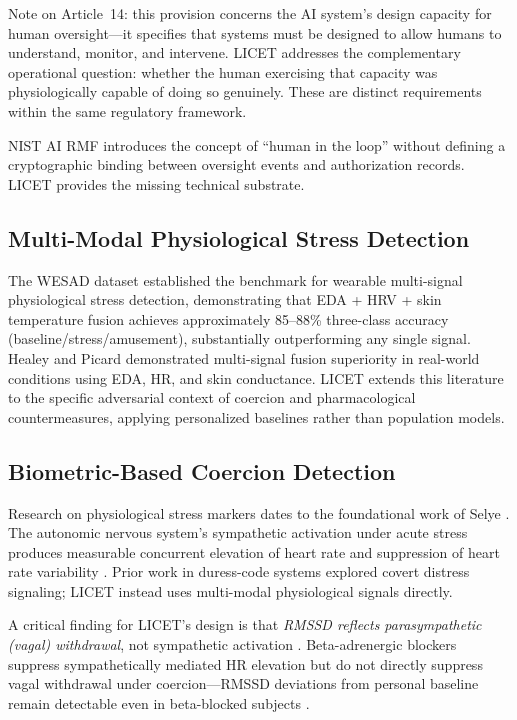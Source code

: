 \documentclass[12pt,a4paper]{article}
\begin{document}
Note on Article~14: this provision concerns the AI system's design capacity
for human oversight---it specifies that systems must be designed to allow
humans to understand, monitor, and intervene. LICET addresses the
complementary operational question: whether the human exercising that capacity
was physiologically capable of doing so genuinely. These are distinct
requirements within the same regulatory framework.

NIST AI RMF \cite{nistairimf2023} introduces the concept of ``human in the
loop'' without defining a cryptographic binding between oversight events and
authorization records. LICET provides the missing technical substrate.

\subsection{Multi-Modal Physiological Stress Detection}

The WESAD dataset \cite{schmidt2018wesad} established the benchmark for
wearable multi-signal physiological stress detection, demonstrating that
EDA + HRV + skin temperature fusion achieves approximately 85--88\% three-class
accuracy (baseline/stress/amusement), substantially outperforming any single
signal. Healey and Picard \cite{healey2005stress} demonstrated multi-signal
fusion superiority in real-world conditions using EDA, HR, and skin
conductance. LICET extends this literature to the specific adversarial context
of coercion and pharmacological countermeasures, applying personalized
baselines rather than population models.

\subsection{Biometric-Based Coercion Detection}

Research on physiological stress markers dates to the foundational work of
Selye \cite{selye1956stress}. The autonomic nervous system's sympathetic
activation under acute stress produces measurable concurrent elevation of heart
rate and suppression of heart rate variability \cite{thayer2012hrv,
kim2018stress}. Prior work in duress-code systems \cite{Capkun2006} explored
covert distress signaling; LICET instead uses multi-modal physiological
signals directly.

A critical finding for LICET's design is that \emph{RMSSD reflects
parasympathetic (vagal) withdrawal}, not sympathetic activation
\cite{fowles1986eda}. Beta-adrenergic blockers suppress sympathetically
mediated HR elevation but do not directly suppress vagal withdrawal under
coercion---RMSSD deviations from personal baseline remain detectable even in
beta-blocked subjects \cite{brantigan1982}.
\end{document}
